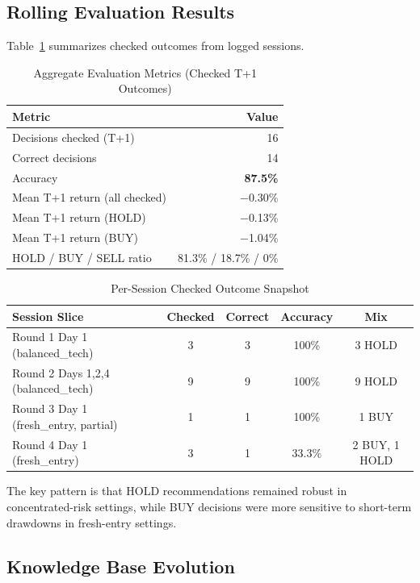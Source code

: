 \documentclass[conference]{IEEEtran}
\begin{document}
\subsection{Rolling Evaluation Results}

Table~\ref{tab:aggregate} summarizes checked outcomes from logged sessions.

\begin{table}[htbp]
\caption{Aggregate Evaluation Metrics (Checked T+1 Outcomes)}
\label{tab:aggregate}
\centering
\begin{tabular}{@{}lr@{}}
\toprule
\textbf{Metric} & \textbf{Value} \\
\midrule
Decisions checked (T+1) & 16 \\
Correct decisions & 14 \\
Accuracy & \textbf{87.5\%} \\
Mean T+1 return (all checked) & $-$0.30\% \\
Mean T+1 return (HOLD) & $-$0.13\% \\
Mean T+1 return (BUY) & $-$1.04\% \\
HOLD / BUY / SELL ratio & 81.3\% / 18.7\% / 0\% \\
\bottomrule
\end{tabular}
\end{table}

\begin{table}[htbp]
\caption{Per-Session Checked Outcome Snapshot}
\label{tab:sessionbreakdown}
\centering
\footnotesize
\begin{tabular}{@{}lcccc@{}}
\toprule
\textbf{Session Slice} & \textbf{Checked} & \textbf{Correct} & \textbf{Accuracy} & \textbf{Mix} \\
\midrule
Round 1 Day 1 (balanced\_tech) & 3 & 3 & 100\% & 3 HOLD \\
Round 2 Days 1,2,4 (balanced\_tech) & 9 & 9 & 100\% & 9 HOLD \\
Round 3 Day 1 (fresh\_entry, partial) & 1 & 1 & 100\% & 1 BUY \\
Round 4 Day 1 (fresh\_entry) & 3 & 1 & 33.3\% & 2 BUY, 1 HOLD \\
\bottomrule
\end{tabular}
\end{table}

The key pattern is that HOLD recommendations remained robust in concentrated-risk settings, while BUY decisions were more sensitive to short-term drawdowns in fresh-entry settings.

\subsection{Knowledge Base Evolution}
\end{document}
